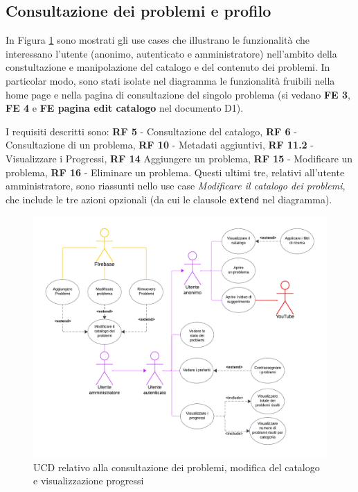\documentclass[11pt, a4paper]{article}
\theoremstyle{definition} %
\begin{document}
\newpage
\subsection{Consultazione dei problemi e profilo}
In Figura \ref{catalogueprobs} sono mostrati gli use cases che illustrano
le funzionalità che interessano l'utente (anonimo, autenticato e amministratore)
nell'ambito della constultazione e manipolazione del catalogo e del contenuto
dei problemi. In particolar modo, sono stati isolate nel diagramma le funzionalità
fruibili nella home page e nella pagina di consultazione
del singolo problema (si vedano \textbf{FE 3}, \textbf{FE 4} e \textbf{FE pagina edit catalogo} nel documento D1).

I requisiti descritti sono: \textbf{RF 5} - Consultazione del catalogo,
\textbf{RF 6} - Consultazione di un problema, \textbf{RF 10} - Metadati aggiuntivi,
\textbf{RF 11.2} - Visualizzare i Progressi, \textbf{RF 14}  Aggiungere un problema,
\textbf{RF 15} - Modificare un problema, \textbf{RF 16} - Eliminare un problema.
Questi ultimi tre, relativi all'utente amministratore, sono riassunti nello use case
\textit{Modificare il catalogo dei problemi}, che include le tre azioni opzionali (da
cui le clausole \texttt{extend} nel diagramma).


\begin{figure}[H]
\centering
\hspace*{-1.5cm}
\includegraphics[scale=0.68]{materiale/ucdiagrams/ucproblemi.pdf}
\caption{UCD relativo alla consultazione dei problemi, modifica del catalogo e visualizzazione progressi}
\label{catalogueprobs}
\end{figure}
\end{document}
